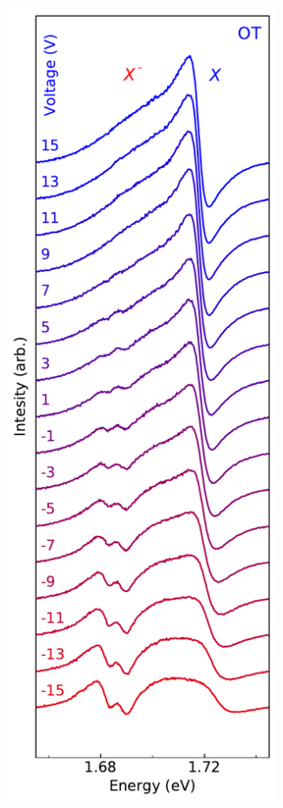 \begin{figure}[t]
	\begin{subfigure}{0.32\textwidth}
		\caption{}
		\includegraphics[width=\textwidth]{waterfall_0TRF}

\end{subfigure}
\end{figure}
